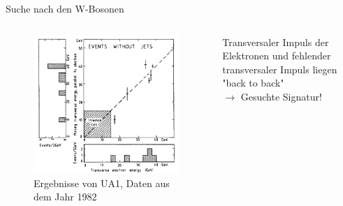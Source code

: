 \documentclass[aspectratio=1610, professionalfonts, 10pt]{beamer}
\begin{document}
\begin{frame}[plain]{Suche nach den W-Bosonen}
		\vspace*{-40px}
	\begin{columns}
			\begin{figure}
	  			\centering
				\includegraphics[width=0.95\textheight]{Images/Screenshot_2018-12-04_18-22-25.png}
				\caption{Ergebnisse von UA1, Daten aus dem Jahr 1982 \cite{doi:10.1142/9789814644150_0006}}
	  			\label{fig:sad}
			\end{figure}
				Transversaler Impuls der Elektronen und fehlender transversaler Impuls liegen "back to back" \\
				$\rightarrow$ Gesuchte Signatur!
	\end{columns}
\end{frame}
\end{document}
